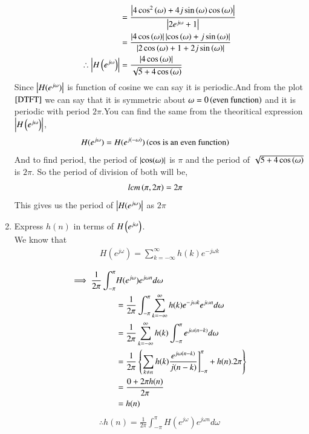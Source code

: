 \documentclass[journal,12pt,twocolumn]{IEEEtran}
\renewcommand\thesection{\arabic{section}}
\begin{document}
\begin{enumerate}[label=\thesection.\arabic*]
\begin{align}
                            &= \frac{\left\vert4\cos^2\left(\omega\right) + 4j\sin\left(\omega\right)\cos\left(\omega\right)\right\vert}{\left\vert2e^{j\omega} + 1\right\vert}\\
                            &= \frac{\left\vert4\cos\left(\omega\right)\right\vert\left\vert\cos\left(\omega\right) + j\sin\left(\omega\right)\right\vert}{\left\vert2\cos\left(\omega\right) + 1 + 2j\sin\left(\omega\right)\right\vert}\\
        \therefore \left\vert H\left(e^{j \omega}\right)\right\vert &= \frac{\left\vert4\cos\left(\omega\right)\right\vert}{\sqrt{5 +4\cos\left(\omega\right)}}
     \end{align}
Since $\left\vert H(e^{j\omega})\right\vert$ is function of cosine we can say it is periodic.And from the plot $\ref{DTFT}$ we can say that it is symmetric about $\omega = 0\left(\text{even function}\right)$ and it is periodic with period $2\pi$.You can find the same from the theoritical expression $\left\vert H\left(e^{j \omega}\right)\right\vert$, 
       \begin{align}
         H(e^{j\omega}) &= H(e^{j(-\omega)})\left(\text{cos is an even function}\right)
       \end{align}
    And to find period, the period of $\left\vert\cos(\omega)\right\vert$ is $\pi$ and the period of $\sqrt{5 + 4\cos\left(\omega\right)}$ is $2\pi$. So the period of division of both will be,
     \begin{align}
      lcm\left(\pi,2\pi\right) &= 2\pi
     \end{align}
     This gives us the period of $\left\vert H(e^{j\omega})\right\vert$ as $2\pi$
  \item Express $h(n)$ in terms of $H\left(e^{j \omega}\right)$.\\
  \solution We know that 
\begin{align}
	H(e^{j\omega})=\sum_{k=-\infty}^\infty h(k)e^{-j\omega k}
\end{align}



\begin{align}
  \implies
\frac{1}{2\pi}\int_{-\pi}^\pi& H(e^{j\omega})e^{j\omega n}d\omega\\
 &=\frac{1}{2\pi}\int_{-\pi}^\pi \sum_{k=-\infty}^\infty h(k)e^{-j\omega k}e^{j\omega n}d\omega\\
 &=\frac{1}{2\pi} \sum_{k=-\infty}^\infty h(k)\int_{-\pi}^\pi e^{j\omega (n-k)}d\omega\\
 &=\frac{1}{2\pi}\left\{ \sum_{k\neq n} h(k)\frac{e^{j\omega (n-k)}}{j(n-k)}\Biggr] _{-\pi}^\pi+h(n).{2\pi} \right\}\\
 &=\frac{0+2\pi h(n)}{2\pi}\\
 &=h(n)
\end{align}
\begin{align}
	\therefore h(n)=\frac{1}{2\pi}\int_{-\pi}^\pi H(e^{j\omega})e^{j\omega n}d\omega 
\end{align}
    \end{enumerate}
\end{document}
